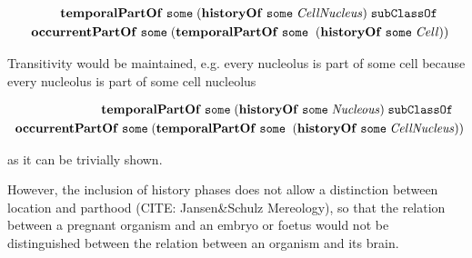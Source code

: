 \begin{equation}
\begin{split}
\mathrm{\mathbf{temporalPartOf}}\;\mathtt{some}\;(\mathrm{\mathbf{historyOf}}\;\mathtt{some}\;\mathit{CellNucleus}) \;\mathtt{subClassOf}\ \; \; \\
\; \; \mathrm{\mathbf{occurrentPartOf}}\;\mathtt{some}\;(\mathrm{\mathbf{temporalPartOf}}\;\mathtt{some}\;
\;(\mathrm{\mathbf{historyOf}}\;\mathtt{some}\;\mathit{Cell}))
\end{split}
\label{eq:historyCell}
\end{equation}    

Transitivity would be maintained, e.g. every nucleolus is part of some cell because every nucleolus is part of some cell nucleolus  

\begin{equation}
\begin{split}
\mathrm{\mathbf{temporalPartOf}}\;\mathtt{some}\;(\mathrm{\mathbf{historyOf}}\;\mathtt{some}\;\mathit{Nucleous}) \;\mathtt{subClassOf}\ \; \; \\
\; \; \mathrm{\mathbf{occurrentPartOf}}\;\mathtt{some}\;(\mathrm{\mathbf{temporalPartOf}}\;\mathtt{some}\;
\;(\mathrm{\mathbf{historyOf}}\;\mathtt{some}\;\mathit{CellNucleus}))
\end{split}
\label{eq:historyCellNucleus}
\end{equation}    

as it can be trivially shown.

However, the inclusion of history phases does not allow a distinction between location and parthood (CITE: Jansen\&Schulz Mereology), so that the relation between a pregnant organism and an embryo or foetus would not be distinguished between the relation between an organism and its brain.


